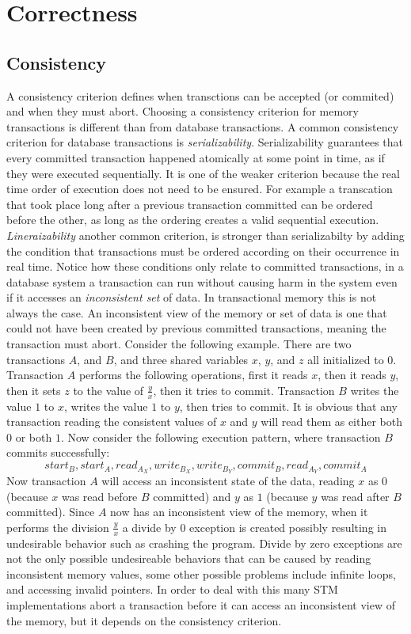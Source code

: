 \section{Correctness}
\subsection{Consistency}
A consistency criterion defines when transctions can be accepted (or commited) and when they must abort. 
Choosing a consistency criterion for memory transactions is different than from database transactions.  A common consistency criterion for database transactions is \emph{serializability}.  Serializability guarantees that every committed transaction happened atomically at some point in time, as if they were executed sequentially.
It is one of the weaker criterion because the real time order of execution does not need to be ensured.
For example a transcation that took place long after a previous transaction committed can be ordered before the other, as long as the ordering creates a valid sequential execution.
\emph{Lineraizability} another common criterion, is stronger than serializabilty by adding the condition that transactions must be ordered according on their occurrence in real time.
Notice how these conditions only relate to committed transactions, in a database system a transaction can run without causing harm in the system even if it accesses an \emph{inconsistent set} of data.
In transactional memory this is not always the case.
An inconsistent view of the memory or set of data is one that could not have been created by previous committed transactions, meaning the transaction must abort.
Consider the following example.  There are two transactions $A$, and $B$, and three shared variables $x$, $y$, and $z$ all initialized to $0$.  Transaction $A$ performs the following operations, first it reads $x$, then it reads $y$, then it sets $z$ to the value of $\frac{y}{x}$, then it tries to commit.
Transaction $B$ writes the value $1$ to $x$, writes the value $1$ to $y$, then tries to commit.
It is obvious that any transaction reading the consistent values of $x$ and $y$ will read them as either both $0$ or both $1$.
Now consider the following execution pattern, where transaction $B$ commits successfully:
$$start_{B}, start_{A}, read_{A_{X}}, write_{B_{X}}, write_{B_{Y}}, commit_{B}, read_{A_{Y}}, commit_{A}$$
Now transaction $A$ will access an inconsistent state of the data, reading $x$ as $0$ (because $x$ was read before $B$ committed) and $y$ as $1$ (because $y$ was read after $B$ committed).
Since $A$ now has an inconsistent view of the memory, when it performs the division $\frac{y}{x}$ a divide by $0$ exception is created possibly resulting in undesirable behavior such as crashing the program.
Divide by zero exceptions are not the only possible undesireable behaviors that can be caused by reading inconsistent memory values, some other possible problems include infinite loops, and accessing invalid pointers.
In order to deal with this many STM implementations abort a transaction before it can access an inconsistent view of the memory, but it depends on the consistency criterion.

